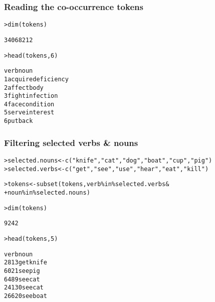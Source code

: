 \begin{frame}[fragile]
  \frametitle{Reading the co-occurrence tokens}

\ungap
\begin{alltt}\small
{}

> dim(tokens) \begin{Rout}
[1] 3406821       2 \end{Rout}

> head(tokens, 6) \begin{Rout}
      verb       noun
1  acquire deficiency
2   affect       body
3    fight  infection
4     face  condition
5    serve   interest
6      put       back \end{Rout}
\end{alltt}
\end{frame}

\begin{frame}[fragile]
  \frametitle{Filtering selected verbs \& nouns}

\ungap
\begin{alltt}\small
{}
> selected.nouns <- c("knife","cat","dog","boat","cup","pig")
> selected.verbs <- c("get","see","use","hear","eat","kill")

> tokens <- subset(tokens, verb \%in\% selected.verbs \&
+                          noun \%in\% selected.nouns)

> dim(tokens) \begin{Rout}
[1] 924   2 \end{Rout}
> head(tokens, 5) \begin{Rout}
      verb  noun
2813   get knife
6021   see   pig
6489   see   cat
24130  see   cat
26620  see  boat  \end{Rout}
\end{alltt}
\end{frame}

